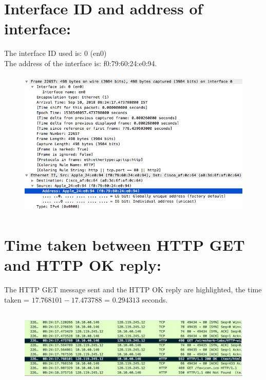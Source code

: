 \documentclass[]{report}
\begin{document}
\section{Interface ID and address of interface:}
The interface ID used is: $0$ (en0)
\\
The address of the interface is: f0:79:60:24:e0:94.
\begin{figure}[H]
	\vspace{0pt}
	\includegraphics[height = 200pt, keepaspectratio]{Snapshots/q7.png}
\end{figure}

\section{Time taken between HTTP GET and HTTP OK reply:}
The HTTP GET message sent and the HTTP OK reply are highlighted, the time taken = $17.768101 - 17.473788$ = $0.294313$ seconds.
\begin{figure}[H]
	\vspace{0pt}
	\includegraphics[height = 105pt, keepaspectratio]{Snapshots/q8.png}
\end{figure}

\end{document}
